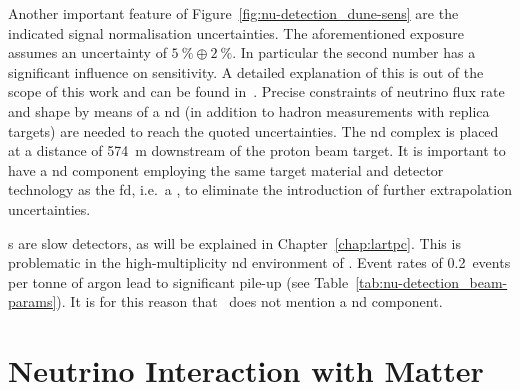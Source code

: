 Another important feature of Figure~\ref{fig:nu-detection_dune-sens} are the indicated signal normalisation uncertainties.
The aforementioned exposure assumes an uncertainty of $\SI{5}{\percent}\oplus\SI{2}{\percent}$.
In particular the second number has a significant influence on sensitivity.
A detailed explanation of this is out of the scope of this work and can be found in~\cite{dune2}.
Precise constraints of neutrino flux rate and shape by means of a \gls{nd} (in addition to hadron measurements with replica targets) are needed to reach the quoted uncertainties.
The \gls{nd} complex is placed at a distance of \SI{574}{\metre} downstream of the proton beam target.
It is important to have a \gls{nd} component employing the same target material and detector technology as the \gls{fd}, i.e.\ a \lartpc{}, to eliminate the introduction of further extrapolation uncertainties.

\lartpc{}s are slow detectors, as will be explained in Chapter~\ref{chap:lartpc}.
This is problematic in the high-multiplicity \gls{nd} environment of \dune{}.
Event rates of \num{0.2}~events per tonne of argon lead to significant pile-up (see Table~\ref{tab:nu-detection_beam-params}).
It is for this reason that~\cite{dune2} does not mention a \gls{nd} \lar{} component.


\section{Neutrino Interaction with Matter}
\label{sec:nu-detection_interactions}

